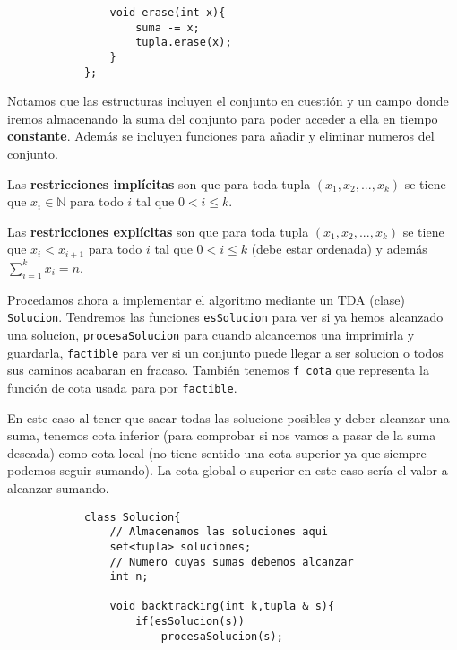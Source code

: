 \documentclass[12pt]{article}
\begin{document}
\begin{ejercicio}
\begin{lstlisting}
                void erase(int x){
                    suma -= x;
                    tupla.erase(x);
                }
            };
        \end{lstlisting}
        Notamos que las estructuras incluyen el conjunto en cuestión 
        y un campo donde iremos almacenando la suma del conjunto 
        para poder acceder a ella en tiempo \textbf{constante}.
        Además se incluyen funciones para añadir y eliminar 
        numeros del conjunto.

        Las \textbf{restricciones implícitas} son que para toda 
        tupla $(x_1,x_2,...,x_k)$ se tiene que $x_i \in \mathbb{N}$
        para todo $i$ tal que $0 < i \leq k$.

        Las \textbf{restricciones explícitas} son que para toda 
        tupla $(x_1,x_2,...,x_k)$ se tiene que $x_i < x_{i+1}$
        para todo $i$ tal que $0 < i \leq k$ (debe estar ordenada)
        y además $\sum\limits_{i=1}^{k}x_i = n$.

        Procedamos ahora a implementar el algoritmo mediante un TDA (clase) 
        \verb|Solucion|. 
        Tendremos las funciones \verb|esSolucion| para ver si ya hemos 
        alcanzado una solucion, \verb|procesaSolucion| para cuando 
        alcancemos una imprimirla y guardarla, \verb|factible| para ver 
        si un conjunto puede llegar a ser solucion o todos sus caminos 
        acabaran en fracaso. También tenemos \verb|f_cota| que 
        representa la función de cota usada para por \verb|factible|.

        En este caso al tener que sacar todas las solucione posibles 
        y deber alcanzar una suma, tenemos cota inferior 
        (para comprobar si nos vamos a pasar de la suma deseada) 
        como cota local (no tiene sentido una cota superior ya que 
        siempre podemos seguir sumando). La cota global o superior 
        en este caso sería el valor a alcanzar sumando.
        \begin{lstlisting}
            class Solucion{
                // Almacenamos las soluciones aqui
                set<tupla> soluciones; 
                // Numero cuyas sumas debemos alcanzar
                int n;

                void backtracking(int k,tupla & s){
                    if(esSolucion(s))
                        procesaSolucion(s);


\end{lstlisting}
\end{ejercicio}
\end{document}
